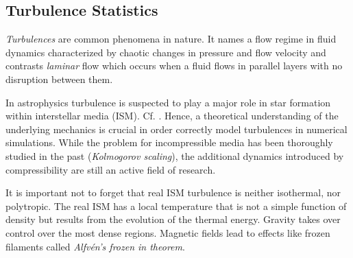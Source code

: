 \subsection{Turbulence Statistics}
\label{sec:turbulence}

\emph{Turbulences} are common phenomena in nature. It names a flow regime in
fluid dynamics characterized by chaotic changes in pressure and flow velocity
and contrasts \emph{laminar} flow which occurs when a fluid flows in parallel
layers with no disruption between them.

In astrophysics turbulence is suspected to play a major role in star formation
within interstellar media (ISM). Cf. \cite{klessen2016physical}.  Hence, a
theoretical understanding of the underlying mechanics is crucial in order
correctly model turbulences in numerical simulations. While the problem for
incompressible media has been thoroughly studied in the past (\emph{Kolmogorov
scaling}), the additional dynamics introduced by compressibility are still an
active field of research.

It is important not to forget that real ISM turbulence is neither isothermal,
nor polytropic. The real ISM has a local temperature that is not a simple
function of density but results from the evolution of the thermal energy.
Gravity takes over control over the most dense regions. Magnetic fields lead to
effects like frozen filaments called \emph{Alfvén's frozen in theorem}.

% 

